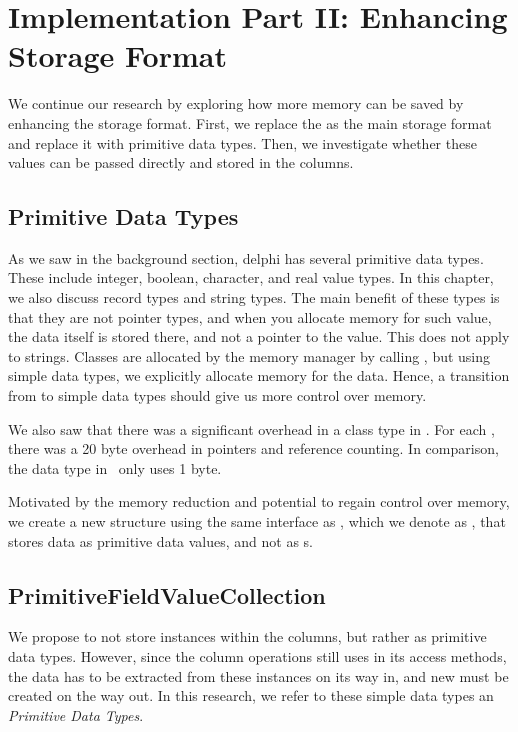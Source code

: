 \chapter{Implementation Part II: Enhancing Storage Format}
\label{chap:storage-format}
We continue our research by exploring how more memory can be saved by enhancing the storage format. First, we replace the  as the main storage format and replace it with primitive data types. Then, we investigate whether these values can be passed directly and stored in the columns.

\section{Primitive Data Types}
\label{sec:Simple Data Types}
As we saw in the background section, delphi has several primitive data types. These include integer, boolean, character, and real value types. In this chapter, we also discuss record types and string types. The main benefit of these types is that they are not pointer types, and when you allocate memory for such value, the data itself is stored there, and not a pointer to the value. This does not apply to strings. Classes are allocated by the memory manager by calling , but using simple data types, we explicitly allocate memory for the data. Hence, a transition from  to simple data types should give us more control over memory.

We also saw that there was a significant overhead in a class type in \delphi. For each , there was a 20 byte overhead in pointers and reference counting. In comparison, the  data type in \delphi~only uses 1 byte.

Motivated by the memory reduction and potential to regain control over memory, we create a new structure using the same interface as , which we denote as , that stores data as primitive data values, and not as s.

\section{PrimitiveFieldValueCollection}
\label{sec:PrimitiveFieldValueCollection}
We propose to not store  instances within the columns, but rather as primitive data types. However, since the column operations still uses  in its access methods, the data has to be extracted from these instances on its way in, and new  must be created on the way out. In this research, we refer to these simple data types an \textit{Primitive Data Types}.

